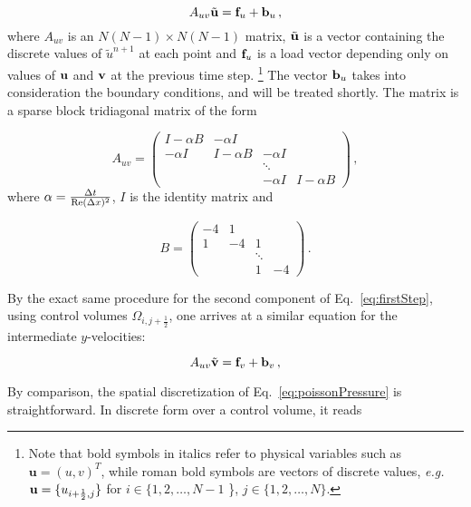 \documentclass[final,3p,twocolumn]{elsarticle}
\begin{document}
\begin{equation}
    A_{uv} \tilde{\bf u} = {\bf f}_u + {\bf b}_u \,,
    \label{eq:xVelocityMatrix}
\end{equation}
%
where $A_{uv}$ is an $N(N-1) \times N(N-1)$ matrix, $\tilde{\bf u}$ is a vector
containing the discrete values of $\tilde{u}^{n+1}$ at each point and ${\bf
f}_u$ is a load vector depending only on values of ${\bf u}$ and ${\bf v}$ at
the previous time step. \footnote{Note that bold symbols in italics refer to
physical variables such as $\bm{u}=(u,v)^T$, while roman bold symbols are
vectors of discrete values, {\em e.g.\ } ${\bf u} = \{u_{i+\frac{1}{2},j}\}$
for $i \in \{ 1,2,\dots,N-1$ \}, $j \in \{ 1,2,\dots,N \}$.} The vector ${\bf b}_u$ takes into
consideration the boundary conditions, and will be treated shortly. The matrix
is a sparse block tridiagonal matrix of the form

\begin{equation*}
    A_{uv} = 
    \begin{pmatrix}
        I - \alpha B & -\alpha I \\
        -\alpha I & I - \alpha B & -\alpha I \\
        & & \ddots \\
        & & -\alpha I & I - \alpha B
    \end{pmatrix} \,,
\end{equation*}
%
where $\alpha = \frac{\Delta t}{{\rm Re}(\Delta x)^2}$, $I$ is the identity
matrix and

\begin{equation*}
    B = 
    \begin{pmatrix}
        -4 & 1 \\
        1 & -4 & 1 \\
        & & \ddots \\ 
        & & 1 & -4
    \end{pmatrix} \,.
\end{equation*}

By the exact same procedure for the second component of Eq.\
\eqref{eq:firstStep}, using control volumes $\Omega_{i,j+\frac{1}{2}}$, one
arrives at a similar equation for the intermediate $y$-velocities: 

\begin{equation}
    A_{uv} \tilde{\bf v} = {\bf f}_v + {\bf b}_v \,,
    \label{eq:yVelocityMatrix}
\end{equation}

By comparison, the spatial discretization of Eq.\ \eqref{eq:poissonPressure} is
straightforward. In discrete form over a control volume, it reads 
\end{document}
